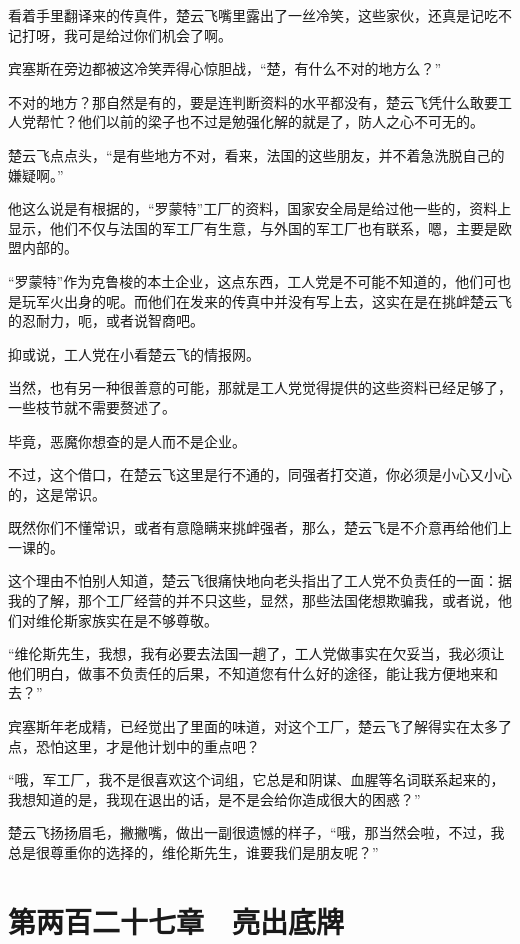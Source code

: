 看着手里翻译来的传真件，楚云飞嘴里露出了一丝冷笑，这些家伙，还真是记吃不记打呀，我可是给过你们机会了啊。

宾塞斯在旁边都被这冷笑弄得心惊胆战，“楚，有什么不对的地方么？”

不对的地方？那自然是有的，要是连判断资料的水平都没有，楚云飞凭什么敢要工人党帮忙？他们以前的梁子也不过是勉强化解的就是了，防人之心不可无的。

楚云飞点点头，“是有些地方不对，看来，法国的这些朋友，并不着急洗脱自己的嫌疑啊。”

他这么说是有根据的，“罗蒙特”工厂的资料，国家安全局是给过他一些的，资料上显示，他们不仅与法国的军工厂有生意，与外国的军工厂也有联系，嗯，主要是欧盟内部的。

“罗蒙特”作为克鲁梭的本土企业，这点东西，工人党是不可能不知道的，他们可也是玩军火出身的呢。而他们在发来的传真中并没有写上去，这实在是在挑衅楚云飞的忍耐力，呃，或者说智商吧。

抑或说，工人党在小看楚云飞的情报网。

当然，也有另一种很善意的可能，那就是工人党觉得提供的这些资料已经足够了，一些枝节就不需要赘述了。

毕竟，恶魔你想查的是人而不是企业。

不过，这个借口，在楚云飞这里是行不通的，同强者打交道，你必须是小心又小心的，这是常识。

既然你们不懂常识，或者有意隐瞒来挑衅强者，那么，楚云飞是不介意再给他们上一课的。

这个理由不怕别人知道，楚云飞很痛快地向老头指出了工人党不负责任的一面：据我的了解，那个工厂经营的并不只这些，显然，那些法国佬想欺骗我，或者说，他们对维伦斯家族实在是不够尊敬。

“维伦斯先生，我想，我有必要去法国一趟了，工人党做事实在欠妥当，我必须让他们明白，做事不负责任的后果，不知道您有什么好的途径，能让我方便地来和去？”

宾塞斯年老成精，已经觉出了里面的味道，对这个工厂，楚云飞了解得实在太多了点，恐怕这里，才是他计划中的重点吧？

“哦，军工厂，我不是很喜欢这个词组，它总是和阴谋、血腥等名词联系起来的，我想知道的是，我现在退出的话，是不是会给你造成很大的困惑？”

楚云飞扬扬眉毛，撇撇嘴，做出一副很遗憾的样子，“哦，那当然会啦，不过，我总是很尊重你的选择的，维伦斯先生，谁要我们是朋友呢？”

\section{第两百二十七章　亮出底牌}

